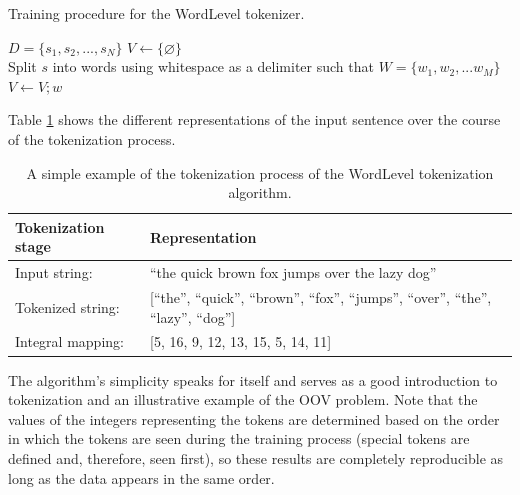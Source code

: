 \documentclass[12pt]{article}
\begin{document}
\begin{algorithm}[!t]
    \caption{Training procedure for the WordLevel tokenizer.}
    \label{alg:wordlevel_training}
    \begin{algorithmic}
        \State $D = \{s_1, s_2, ..., s_N\}$
        \State $V \gets \{\varnothing\}$
        \\

        \State Split $s$ into words using whitespace as a delimiter such that
        \State $W=\{w_1, w_2, ... w_M\}$
        \\

        \State $V \gets V;w$
        \EndIf
        \EndFor
        \EndFor
    \end{algorithmic}
\end{algorithm}

Table \ref{tab:wordlevel_tokenization_example} shows the different representations of the input sentence over the course of the tokenization process.

\begin{table}[!t]
    \centering
    \begin{tabular}{l l}
        \toprule
        Tokenization stage & Representation                                                                            \\
        \midrule
        Input string:      & ``the quick brown fox jumps over the lazy dog''                                           \\
        Tokenized string:  & [``the'', ``quick'', ``brown'', ``fox'', ``jumps'', ``over'', ``the'', ``lazy'', ``dog''] \\
        Integral mapping:  & [5, 16, 9, 12, 13, 15, 5, 14, 11]                                                         \\
        \bottomrule
    \end{tabular}
    \caption{A simple example of the tokenization process of the WordLevel tokenization algorithm.}
    \label{tab:wordlevel_tokenization_example}
\end{table}

The algorithm's simplicity speaks for itself and serves as a good introduction to tokenization and an illustrative example of the OOV problem. Note
that the values of the integers representing the tokens are determined based on the order in which the tokens are seen during the training process
(special tokens are defined and, therefore, seen first), so these results are completely reproducible as long as the data appears in the same order.
\end{document}
